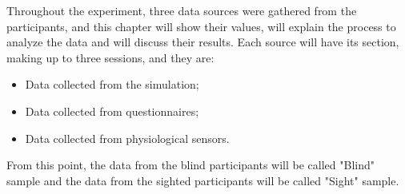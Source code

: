 

Throughout the experiment, three data sources were gathered from the participants, and this chapter will show their values, will explain the process to analyze the data and will discuss their results. Each source will have its section, making up to three sessions, and they are:

\begin{itemize}
    \item Data collected from the simulation;
    \item Data collected from questionnaires;
    \item Data collected from physiological sensors.
\end{itemize}

From this point, the data from the blind participants will be called "Blind" sample and the data from the sighted participants will be called "Sight" sample.

